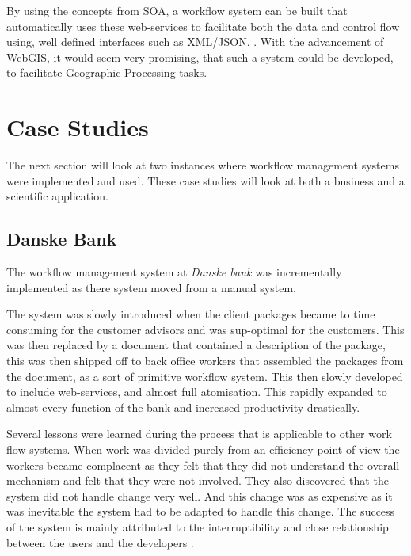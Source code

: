 \documentclass[11pt,twocolumn]{article}
\begin{document}
    By using the concepts from SOA, a workflow system can
    be built that automatically uses these web-services
    to facilitate both the data and control flow using,
    well defined interfaces such as XML/JSON.
    \cite{Shegalov:2001:XWM:767132.767139}. With the
    advancement of WebGIS, it would seem very promising,
    that such a system could be developed, to facilitate
    Geographic Processing tasks.


\section{Case Studies}
    The next section will look at two instances where
    workflow management systems were implemented and used.
    These case studies will look at both a business and a
    scientific application.
    \subsection*{Danske Bank}
    The workflow management system at \emph{Danske bank} was
      incrementally implemented as there system moved
      from a manual system.

      The system was slowly introduced when the client
      packages became to time consuming for the customer
      advisors and was sup-optimal for the customers.
      This was then replaced by a document that contained
      a description of the package, this was then shipped
      off to back office workers that assembled the packages
      from the document, as a sort of primitive workflow system.
      This then slowly developed to include web-services,
      and almost full atomisation. This rapidly expanded
      to almost every function of the bank and increased
      productivity drastically.

      Several lessons were learned during the process that
      is applicable to other work flow systems. When work
      was divided purely from an efficiency point of view
      the workers became complacent as they felt that they
      did not understand the overall mechanism and felt that
      they were not involved. They also discovered that the
      system did not handle change very well. And this change
      was as expensive as it was inevitable the system had
      to be adapted to handle this change. The success of the
      system is mainly attributed to the interruptibility and
      close relationship between the users and the developers
      \cite{Brahe:2007:SWW:1316624.1316661}.
\end{document}
